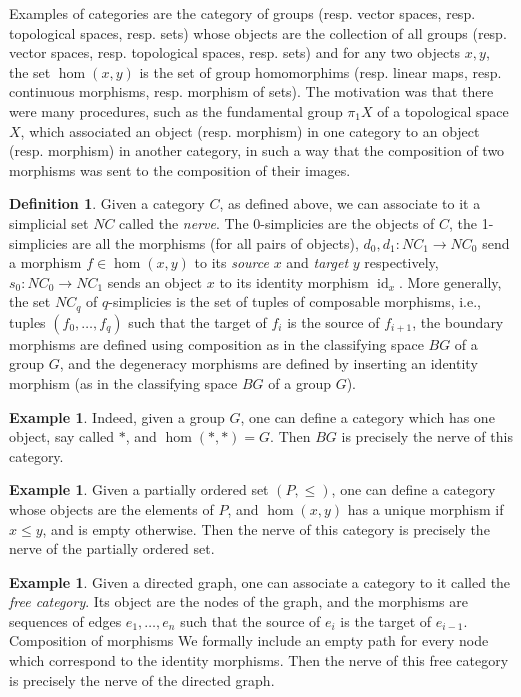 \documentclass[a4paper]{amsart}
\numberwithin{figure}{section}
\theoremstyle{theorem}
\theoremstyle{definition}
\newtheorem{defi}[thm]{Definition}
\newtheorem{exam}[thm]{Example}
\DeclareMathOperator{\id}{id}
\begin{document}
Examples of categories are the category of groups (resp. vector spaces, resp. topological spaces, resp. sets) whose objects are the collection of all groups (resp. vector spaces, resp. topological spaces, resp. sets) and for any two objects $x, y$, the set $\hom(x, y)$ is the set of group homomorphims (resp. linear maps, resp. continuous morphisms, resp. morphism of sets). The motivation was that there were many procedures, such as the fundamental group $\pi_1X$ of a topological space $X$, which associated an object (resp. morphism) in one category to an object (resp. morphism) in another category, in such a way that the composition of two morphisms was sent to the composition of their images. %

\begin{defi}
Given a category $C$, as defined above, we can associate to it a simplicial set $NC$ called the \emph{nerve}. The 0-simplicies are the objects of $C$, the 1-simplicies are all the morphisms (for all pairs of objects), $d_0, d_1: NC_1 \to NC_0$ send a morphism $f \in \hom(x, y)$ to its \emph{source} $x$ and \emph{target} $y$ respectively, $s_0: NC_0 \to NC_1$ sends an object $x$ to its identity morphism $\id_x$. More generally, the set $NC_q$ of $q$-simplicies is the set of tuples of composable morphisms, i.e., tuples $(f_0, \dots, f_q)$ such that the target of $f_i$ is the source of $f_{i+1}$, the boundary morphisms are defined using composition as in the classifying space $BG$ of a group $G$, and the degeneracy morphisms are defined by inserting an identity morphism (as in the classifying space $BG$ of a group $G$).
\end{defi}

\begin{exam}
Indeed, given a group $G$, one can define a category which has one object, say called $\ast$, and $\hom(\ast, \ast) = G$. Then $BG$ is precisely the nerve of this category.
\end{exam}

\begin{exam}
Given a partially ordered set $(P, \leq)$, one can define a category whose objects are the elements of $P$, and $\hom(x, y)$ has a unique morphism if $x \leq y$, and is empty otherwise. Then the nerve of this category is precisely the nerve of the partially ordered set.
\end{exam}

\begin{exam}
Given a directed graph, one can associate a category to it called the \emph{free category}. Its object are the nodes of the graph, and the morphisms are sequences of edges $e_1, \dots, e_n$ such that the source of $e_i$ is the target of $e_{i-1}$. Composition of morphisms We formally include an empty path for every node which correspond to the identity morphisms. Then the nerve of this free category is precisely the nerve of the directed graph.
\end{exam}
\end{document}
